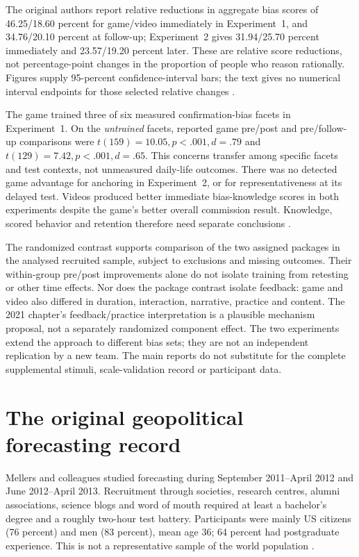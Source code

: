 The original authors report relative reductions in aggregate bias scores
of 46.25/18.60 percent for game/video immediately in Experiment~1,
and 34.76/20.10 percent at follow-up; Experiment~2 gives
31.94/25.70 percent immediately and 23.57/19.20 percent later.
These are relative score reductions, not percentage-point changes in
the proportion of people who reason rationally. Figures supply 95-percent
confidence-interval bars; the text gives no numerical interval endpoints
for those selected relative changes
\cite[online p.~9, figure~2]{MorewedgeEtAl2015Debiasing}.

The game trained three of six measured confirmation-bias facets in
Experiment~1. On the \emph{untrained} facets, reported game pre/post and
pre/follow-up comparisons were \(t(159)=10.05,p<.001,d=.79\)
and \(t(129)=7.42,p<.001,d=.65\). This concerns transfer among
specific facets and test contexts, not unmeasured daily-life outcomes.
There was no detected game advantage for anchoring in Experiment~2,
or for representativeness at its delayed test. Videos produced better
immediate bias-knowledge scores in both experiments despite the game's
better overall commission result. Knowledge, scored behavior and
retention therefore need separate conclusions
\cite[online pp.~6--8, figures~2--3]{MorewedgeEtAl2015Debiasing}.

The randomized contrast supports comparison of the two assigned packages
in the analysed recruited sample, subject to exclusions and missing
outcomes. Their within-group pre/post improvements alone do not isolate
training from retesting or other time effects. Nor does the package
contrast isolate feedback: game and video also differed in duration,
interaction, narrative, practice and content. The 2021 chapter's
feedback/practice interpretation is a plausible mechanism proposal, not
a separately randomized component effect. The two experiments extend
the approach to different bias sets; they are not an independent
replication by a new team. The main reports do not substitute for the
complete supplemental stimuli, scale-validation record or participant data.

\section{The original geopolitical forecasting record}
\label{sec:p19-r153-forecasting}

Mellers and colleagues studied forecasting during September 2011--April
2012 and June 2012--April 2013. Recruitment through societies, research
centres, alumni associations, science blogs and word of mouth required
at least a bachelor's degree and a roughly two-hour test battery.
Participants were mainly US citizens (76 percent) and men (83 percent),
mean age 36; 64 percent had postgraduate experience. This is not a
representative sample of the world population
\cite[online p.~3]{MellersEtAl2014ForecastTraining}.

